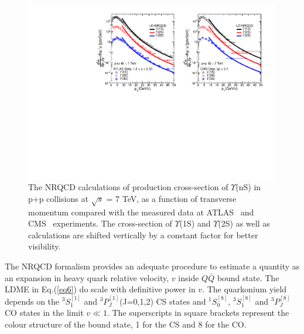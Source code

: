 \begin{figure}
  \centering
  \includegraphics[width=0.99\textwidth]{Figures/NRQCD_Beauty/Fig_CMS_ATLAS_YnS_7TeV_Pt.pdf}
  \caption{\small{The NRQCD calculations of production cross-section of $\Upsilon$(nS) in p+p collisions at 
      $\sqrt{s}$ = 7 TeV, as a function of transverse momentum compared with the measured data 
      at ATLAS~\cite{Aad:2012dlq} and CMS~\cite{Chatrchyan:2013yna} experiments. The cross-section of $\Upsilon$(1S)
      and $\Upsilon$(2S) as well as calculations are shifted vertically by a constant factor for better visibility.}}
  \label{Fig:SigmaYnSCMS13TeV}
\end{figure}



The NRQCD formalism provides an adequate procedure to estimate a quantity as an expansion in 
heavy quark relative velocity, $v$ inside $Q\bar{Q}$ bound state. The LDME in Eq.(\ref{eq6})
do scale with definitive power in $v$. The quarkonium yield depends on the $^3S_1^{[1]}$ 
and $^3P_J^{[1]}$(J=0,1,2) CS states and $^1S_0^{[8]}$, $^3S_1^{[8]}$ and $^3P_J^{[8]}$
CO states in the limit $v\ll 1$.
The superscripts in square brackets represent the colour structure of the bound state,
1 for the CS and 8 for the CO.






